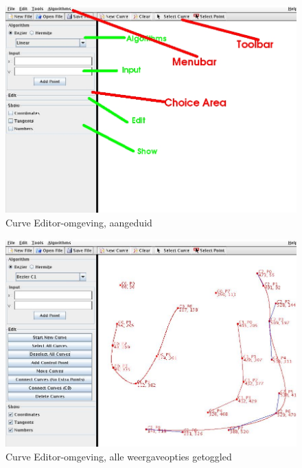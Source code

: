 \documentclass[a4paper,11pt,oneside, titlepage]{article}
\begin{document}
\begin{figure}[htbp]
\centering
\includegraphics[scale=0.4]{./screenies/startMarked.jpg}
\caption{Curve Editor-omgeving, aangeduid}\label{scrTot}
\end{figure}
\begin{figure}[htbp]
\centering
\includegraphics[scale=0.4]{./screenies/toggled.jpg}
\caption{Curve Editor-omgeving, alle weergaveopties getoggled}\label{scrTog}
\end{figure}
\end{document}
